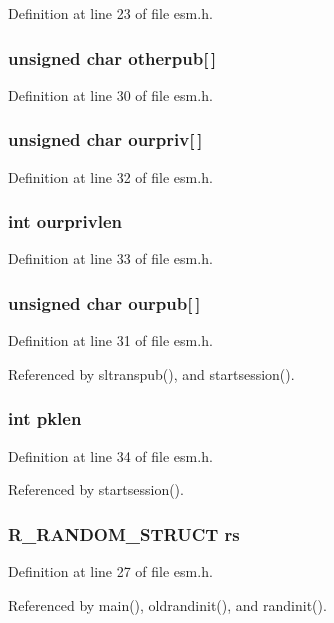 Definition at line 23 of file esm.h.
\subsubsection{\setlength{\rightskip}{0pt plus 5cm}unsigned char {\bf otherpub}[$\,$]}\label{esm_8h_a10}




Definition at line 30 of file esm.h.
\subsubsection{\setlength{\rightskip}{0pt plus 5cm}unsigned char {\bf ourpriv}[$\,$]}\label{esm_8h_a12}




Definition at line 32 of file esm.h.
\subsubsection{\setlength{\rightskip}{0pt plus 5cm}int {\bf ourprivlen}}\label{esm_8h_a13}




Definition at line 33 of file esm.h.
\subsubsection{\setlength{\rightskip}{0pt plus 5cm}unsigned char {\bf ourpub}[$\,$]}\label{esm_8h_a11}




Definition at line 31 of file esm.h.

Referenced by sltranspub(), and startsession().
\subsubsection{\setlength{\rightskip}{0pt plus 5cm}int {\bf pklen}}\label{esm_8h_a14}




Definition at line 34 of file esm.h.

Referenced by startsession().
\subsubsection{\setlength{\rightskip}{0pt plus 5cm}R\_\-RANDOM\_\-STRUCT {\bf rs}}\label{esm_8h_a6}




Definition at line 27 of file esm.h.

Referenced by main(), oldrandinit(), and randinit().